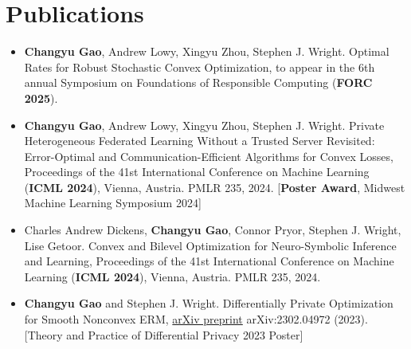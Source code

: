 \documentclass[letterpaper,12pt]{article}
\begin{document}
\section{Publications}

\begin{itemize}[leftmargin=*, label={}]
  \item \textbf{Changyu Gao}, Andrew Lowy, Xingyu Zhou, Stephen J. Wright. Optimal Rates for Robust Stochastic Convex Optimization, to appear in the 6th annual Symposium on Foundations of Responsible Computing (\textbf{FORC 2025}).

  \item
    \textbf{Changyu Gao}, Andrew Lowy, Xingyu Zhou, Stephen J. Wright. Private Heterogeneous Federated Learning Without a Trusted Server Revisited: Error-Optimal and Communication-Efficient Algorithms for Convex Losses, Proceedings of the 41st International Conference on Machine Learning (\textbf{ICML 2024}), Vienna, Austria. PMLR 235, 2024. [\textbf{Poster Award}, Midwest Machine Learning Symposium 2024]

  \item
    Charles Andrew Dickens, \textbf{Changyu Gao}, Connor Pryor, Stephen J. Wright, Lise Getoor.
    Convex and Bilevel Optimization for Neuro-Symbolic Inference and Learning, Proceedings of the 41st International Conference on Machine Learning (\textbf{ICML 2024}), Vienna, Austria. PMLR 235, 2024.

  \item \textbf{Changyu Gao} and Stephen J. Wright. Differentially Private Optimization for Smooth Nonconvex ERM,
    \href{https://arxiv.org/abs/2302.04972}{arXiv preprint} arXiv:2302.04972 (2023). [Theory and Practice of Differential Privacy 2023 Poster]
  
\end{itemize}
\end{document}
